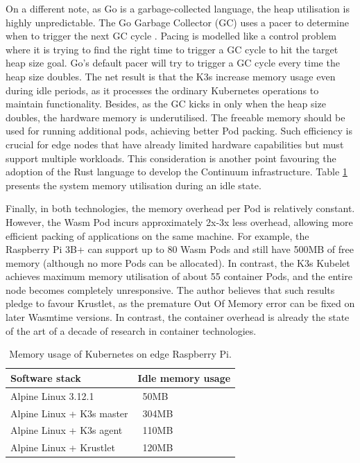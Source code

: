 On a different note, as Go is a garbage-collected language, the heap utilisation is highly unpredictable. The Go Garbage Collector (GC) uses a pacer to determine when to trigger the next GC cycle \cite{go-gc}. Pacing is modelled like a control problem where it is trying to find the right time to trigger a GC cycle to hit the target heap size goal. Go’s default pacer will try to trigger a GC cycle every time the heap size doubles. The net result is that the K3s increase memory usage even during idle periods, as it processes the ordinary Kubernetes operations to maintain functionality. Besides, as the GC kicks in only when the heap size doubles, the hardware memory is underutilised. The freeable memory should be used for running additional pods, achieving better Pod packing. Such efficiency is crucial for edge nodes that have already limited hardware capabilities but must support multiple workloads. This consideration is another point favouring the adoption of the Rust language to develop the Continuum infrastructure. Table \ref{tab1} presents the system memory utilisation during an idle state.

Finally, in both technologies, the memory overhead per Pod is relatively constant. However, the Wasm Pod incurs approximately 2x-3x less overhead, allowing more efficient packing of applications on the same machine. For example, the Raspberry Pi 3B+ can support up to 80 Wasm Pods and still have 500MB of free memory (although no more Pods can be allocated). In contrast, the K3s Kubelet achieves maximum memory utilisation of about 55 container Pods, and the entire node becomes completely unresponsive. The author believes that such results pledge to favour Krustlet, as the premature Out Of Memory error can be fixed on later Wasmtime versions. In contrast, the container overhead is already the state of the art of a decade of research in container technologies.

\begin{table}
\caption{Memory usage of Kubernetes on edge Raspberry Pi.}
\begin{tabular}{|l|l|}
\hline
Software stack & Idle memory usage \\
\hline
Alpine Linux 3.12.1 & ~50MB \\
Alpine Linux + K3s master & ~304MB \\
Alpine Linux + K3s agent & ~110MB \\
Alpine Linux + Krustlet & ~120MB \\
\hline
\end{tabular}
\label{tab1}
\end{table}

